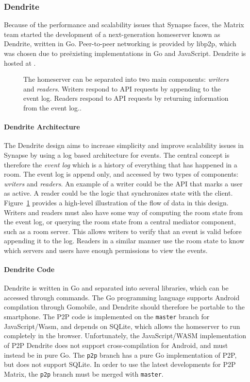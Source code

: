 \subsubsection{Dendrite}\label{sec:dendrite}
Because of the performance and scalability issues that Synapse faces, the Matrix team started the development of a next-generation homeserver known as Dendrite, written in Go.
Peer-to-peer networking is provided by libp2p, which was chosen due to preëxisting implementations in Go and JavaScript.
Dendrite is hosted at .

\begin{figure}
	\centering
	\resizebox{!}{!}{}
	\caption{
		The homeserver can be separated into two main components: \textit{writers} and \textit{readers}.
		Writers respond to API requests by appending to the event log.
		Readers respond to API requests by returning information from the event log.\cite{dendrite_design_md}.
	}%
	\label{fig:dendrite_design}
\end{figure}

\paragraph{Dendrite Architecture}
The Dendrite design aims to increase simplicity and improve scalability issues in Synapse by using a log based architecture for events.
The central concept is therefore the \textit{event log} which is a history of everything that has happened in a room.
The event log is append only, and accessed by two types of components: \textit{writers} and \textit{readers}.
An example of a writer could be the API that marks a user as active.
A reader could be the logic that synchronizes state with the client.
Figure~\ref{fig:dendrite_design} provides a high-level illustration of the flow of data in this design.
Writers and readers must also have some way of computing the room state from the event log, or querying the room state from a central mediator component, such as a room server.
This allows writers to verify that an event is valid before appending it to the log.
Readers in a similar manner use the room state to know which servers and users have enough permissions to view the events.

\paragraph{Dendrite Code}
Dendrite is written in Go\cite{golang_org} and separated into several libraries, which can be accessed through commands.
The Go programming language supports Android compilation through Gomobile\cite{gomobile}, and Dendrite should therefore be portable to the smartphone.
The \ac{P2P} code is implemented on the \texttt{master} branch for JavaScript/Wasm, and depends on SQLite, which allows the homeserver to run completely in the browser.
Unfortunately, the JavaScript/WASM implementation of \ac{P2P} Dendrite does not support cross-compilation for Android, and must instead be in pure Go.
The \texttt{p2p} branch has a pure Go implementation of \ac{P2P}, but does not support SQLite.
In order to use the latest developments for \ac{P2P} Matrix, the \texttt{p2p} branch must be merged with \texttt{master}.

